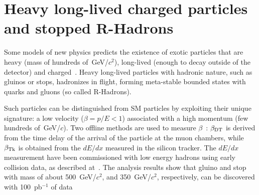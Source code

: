 \documentclass{PoS}
\begin{document}
\section{Heavy long-lived charged particles and stopped R-Hadrons} \label{HSCP}
Some models of new physics predicts the existence 
of exotic particles that are heavy (mass of hundreds of~GeV/$c^2$), 
long-lived (enough to decay outside of the detector) and charged~\cite{Fairbairn:2006gg}. 
Heavy long-lived particles with hadronic nature, such as gluinos or stops, 
hadronizes in flight, forming meta-stable bounded states with quarks and gluons (so called R-Hadrons).

Such particles can be distinguished from SM particles
by exploiting their unique signature: a low velocity ($\beta=p/E<1$) 
associated with a high momentum (few hundreds of~GeV/$c$).
Two offline methods are used to measure $\beta$~\cite{HSCP}:
$\beta_{{\rm DT}}$ is derived from the time delay of the arrival of the particle
at the muon chambers, while $\beta_{{\rm Tk}}$ is obtained from the $dE/dx$ 
measured in the silicon tracker.
The $dE/dx$ measurement have been commissioned with low energy hadrons 
using early collision data, as described at~\cite{TRACKERPAS}.
The analysis results show that gluino and stop 
with mass of about 500~GeV/$c^2$, and 350~GeV/$c^2$, 
respectively, can be discovered with 100~pb$^{-1}$ of data
\end{document}

